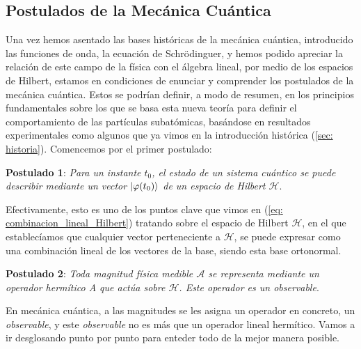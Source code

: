 \documentclass{article}
\numberwithin{equation}{section} %
\begin{document}
    \vspace{5mm}

    \subsection{Postulados de la Mecánica Cuántica}\label{sec: postulados}

    \vspace{5mm}

    Una vez hemos asentado las bases históricas de la mecánica cuántica, introducido las funciones de onda, la ecuación de Schrödinguer, y hemos podido apreciar la relación de este campo de la física con el álgebra lineal, por medio de los espacios de Hilbert, estamos en condiciones de enunciar y comprender los postulados de la mecánica cuántica. Estos se podrían definir, a modo de resumen, en los principios fundamentales sobre los que se basa esta nueva teoría para definir el comportamiento de las partículas subatómicas, basándose en resultados experimentales como algunos que ya vimos en la introducción histórica (\ref{sec: historia}). Comencemos por el primer postulado:
    
    \vspace{7.5mm}

    \textbf{Postulado 1}: \textit{Para un instante \( t_{0} \), el estado de un sistema cuántico se puede describir mediante un vector \( \ket{\varphi(t_{0})} \) de un espacio de Hilbert \( \mathcal{H} \)}.

    \vspace{2.5mm}

    Efectivamente, esto es uno de los puntos clave que vimos en (\ref{eq: combinacion_lineal_Hilbert}) tratando sobre el espacio de Hilbert \( \mathcal{H}\), en el que establecíamos que cualquier vector perteneciente a \( \mathcal{H} \), se puede expresar como una combinación lineal de los vectores de la base, siendo esta base ortonormal.

    \vspace{10mm}

    \textbf{Postulado 2}: \textit{Toda magnitud física medible \( \mathcal{A} \) se representa mediante un operador
    hermítico A que actúa sobre \( \mathcal{H} \). Este operador es un observable}.
    
    \vspace{5mm}

    En mecánica cuántica, a las magnitudes se les asigna un operador en concreto, un \textit{observable}, y este \textit{observable} no es más que un operador lineal hermítico. Vamos a ir desglosando punto por punto para enteder todo de la mejor manera posible.
\end{document}
